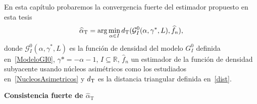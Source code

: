 En esta capítulo probaremos la convergencia fuerte del estimador propuesto en esta tesis 
\begin{align}
\label{EstMinDist}
\widehat{\alpha}_{\text{T}}=\arg\min\limits_{\alpha \in I}d_{\tiny{\text{T}}}(\mathcal{G}_I^0(\alpha,\gamma^*,L),\widehat{f}_n),
\end{align}
donde $\mathcal{G}_I^0(\alpha,\gamma^*,L)$ es la función de densidad del modelo $G_I^0$ definida en~\ref{ModeloGI0}, $\gamma*=-\alpha-1$, $I \subseteq \mathbb{R}$, $\widehat{f}_n$ un estimador de la función de densidad subyacente usando núcleos asimétricos como los estudiados en~\ref{NucleosAsimetricos} y $d_{\tiny{\text{T}}}$ es la distancia triangular definida en~\ref{dist}.

\vspace{1cm}

\noindent \textbf{{\large Consistencia fuerte de $\widehat{\alpha}_{\text{T}}$}}

\vspace{0.5cm}




